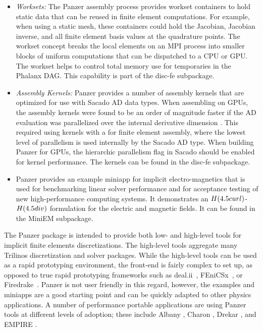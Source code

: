 \begin{itemize}
\item \emph{Worksets:} The Panzer assembly process provides workset containers to hold static data that can be reused in finite element computations. For example, when using a static mesh, these containers could hold the Jacobian, Jacobian inverse, and all finite element basis values at the quadrature points. The workset concept breaks the local elements on an MPI process into smaller blocks of uniform computations that can be dispatched to a CPU or GPU. The workset helps to control total memory use for temporaries in the Phalanx DAG. This capability is part of the disc-fe subpackage.
\item \emph{Assembly Kernels:} Panzer provides a number of assembly kernels that are optimized for use with Sacado AD data types. When assembling on GPUs, the assembly kernels were found to be an order of magnitude faster if the AD evaluation was parallelized over the internal derivative dimension \cite{phipps2022automatic}. This required using kernels with a  for finite element assembly, where the lowest level of parallelism is used internally by the Sacado AD type. When building Panzer for GPUs, the  hierarchic parallelism flag in Sacado should be enabled for kernel performance. The kernels can be found in the disc-fe subpackage.
\item Panzer provides an example miniapp for implicit electro-magnetics that is used for benchmarking linear solver performance and for acceptance testing of new high-performance computing systems. It demonstrates an $H(\rm{curl})$-$H(\rm{div})$ formulation for the electric and magnetic fields. It can be found in the MiniEM subpackage.
\end{itemize}

The Panzer package is intended to provide both low- and high-level tools for implicit finite elements discretizations. The high-level tools aggregate many Trilinos discretization and solver packages. While the high-level tools can be used as a rapid prototyping environment, the front-end is fairly complex to set up, as opposed to true rapid prototyping frameworks such as deal.ii~\cite{dealII95}, FEniCSx~\cite{BarattaEtal2023}, or Firedrake~\cite{FiredrakeUserManual}. Panzer is not user friendly in this regard, however, the examples and miniapps are a good starting point and can be quickly adapted to other physics applications. A number of performance portable applications are using Panzer tools at different levels of adoption; these include Albany \cite{Salinger2016}, Charon \cite{CharonUsersManual2020}, Drekar \cite{Crockatt2022,Miller2019,Shadid2016mhd}, and EMPIRE \cite{BettencourtBrownEtAl2021_EmpirePic}.

